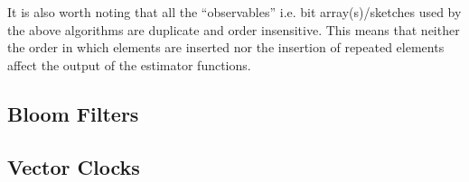It is also worth noting that all the ``observables'' i.e. bit
array(s)/sketches used by the above algorithms are duplicate and order
insensitive. This means that neither the order in which elements
are inserted nor the insertion of repeated elements affect the
output of the estimator functions.

\subsection{Bloom Filters}
\label{sec:bloom_filters}


\subsection{Vector Clocks}
\label{sec:vector_clocks}

